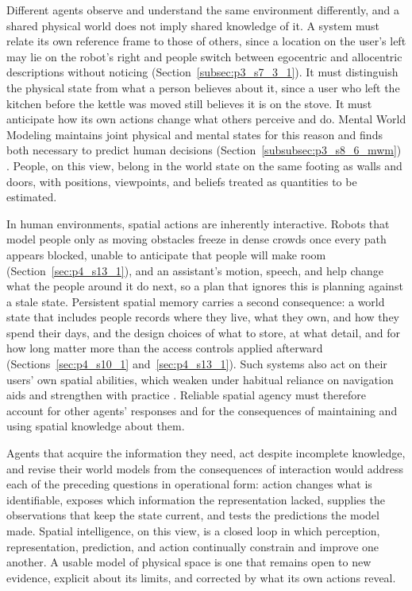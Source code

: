 Different agents observe and understand the same environment differently, and a shared physical world does not imply shared knowledge of it.
A system must relate its own reference frame to those of others, since a location on the user's left may lie on the robot's right and people switch between egocentric and allocentric descriptions without noticing (Section~\ref{subsec:p3_s7_3_1}).
It must distinguish the physical state from what a person believes about it, since a user who left the kitchen before the kettle was moved still believes it is on the stove.
It must anticipate how its own actions change what others perceive and do.
Mental World Modeling maintains joint physical and mental states for this reason and finds both necessary to predict human decisions (Section~\ref{subsubsec:p3_s8_6_mwm}) \cite{fei2026mental}.
People, on this view, belong in the world state on the same footing as walls and doors, with positions, viewpoints, and beliefs treated as quantities to be estimated.

In human environments, spatial actions are inherently interactive.
Robots that model people only as moving obstacles freeze in dense crowds once every path appears blocked, unable to anticipate that people will make room (Section~\ref{sec:p4_s13_1}), and an assistant's motion, speech, and help change what the people around it do next, so a plan that ignores this is planning against a stale state.
Persistent spatial memory carries a second consequence: a world state that includes people records where they live, what they own, and how they spend their days, and the design choices of what to store, at what detail, and for how long matter more than the access controls applied afterward (Sections~\ref{sec:p4_s10_1} and~\ref{sec:p4_s13_1}).
Such systems also act on their users' own spatial abilities, which weaken under habitual reliance on navigation aids and strengthen with practice \cite{dahmani2020habitual}.
Reliable spatial agency must therefore account for other agents' responses and for the consequences of maintaining and using spatial knowledge about them.

Agents that acquire the information they need, act despite incomplete knowledge, and revise their world models from the consequences of interaction would address each of the preceding questions in operational form: action changes what is identifiable, exposes which information the representation lacked, supplies the observations that keep the state current, and tests the predictions the model made.
Spatial intelligence, on this view, is a closed loop in which perception, representation, prediction, and action continually constrain and improve one another.
A usable model of physical space is one that remains open to new evidence, explicit about its limits, and corrected by what its own actions reveal.
